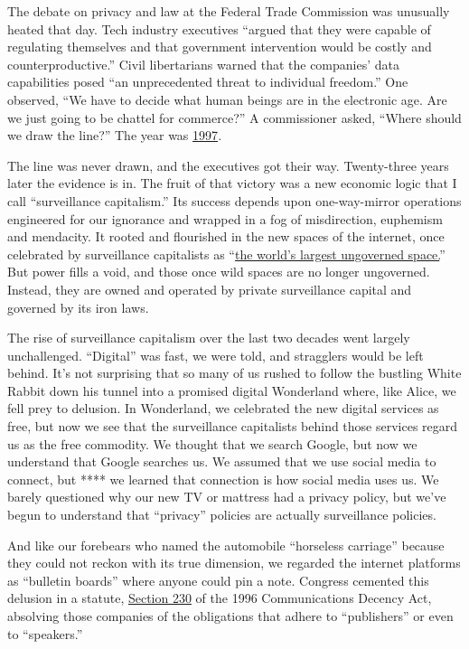 The debate on privacy and law at the Federal Trade Commission was
unusually heated that day. Tech industry executives ``argued that they
were capable of regulating themselves and that government intervention
would be costly and counterproductive.'' Civil libertarians warned that
the companies' data capabilities posed ``an unprecedented threat to
individual freedom.'' One observed, ``We have to decide what human
beings are in the electronic age. Are we just going to be chattel for
commerce?'' A commissioner asked, ``Where should we draw the line?'' The
year was
\href{https://www.nytimes.com/1997/06/11/us/ftc-opens-hearings-on-computers-threat-to-privacy-and-liberty.html?searchResultPosition=34}{1997}\emph{.}

The line was never drawn, and the executives got their way. Twenty-three
years later the evidence is in. The fruit of that victory was a new
economic logic that I call ``surveillance capitalism.'' Its success
depends upon one-way-mirror operations engineered for our ignorance and
wrapped in a fog of misdirection, euphemism and mendacity. It rooted and
flourished in the new spaces of the internet, once celebrated by
surveillance capitalists as
``\href{https://www.pbs.org/newshour/science/in-new-digital-age-google-leaders-see-more-possibilities-to-connect-the-worlds-7-billion}{the
world's largest ungoverned space.}'' But power fills a void, and those
once wild spaces are no longer ungoverned. Instead, they are owned and
operated by private surveillance capital and governed by its iron laws.

The rise of surveillance capitalism over the last two decades went
largely unchallenged. ``Digital'' was fast, we were told, and stragglers
would be left behind. It's not surprising that so many of us rushed to
follow the bustling White Rabbit down his tunnel into a promised digital
Wonderland where, like Alice, we fell prey to delusion. In Wonderland,
we celebrated the new digital services as free, but now we see that the
surveillance capitalists behind those services regard us as the free
commodity. We thought that we search Google, but now we understand that
Google searches us. We assumed that we use social media to connect, but
**** we learned that connection is how social media uses us. We barely
questioned why our new TV or mattress had a privacy policy, but we've
begun to understand that ``privacy'' policies are actually surveillance
policies.

And like our forebears who named the automobile ``horseless carriage''
because they could not reckon with its true dimension, we regarded the
internet platforms as ``bulletin boards'' where anyone could pin a note.
Congress cemented this delusion in a statute,
\href{https://www.law.cornell.edu/uscode/text/47/230}{Section 230} of
the 1996 Communications Decency Act, absolving those companies of the
obligations that adhere to ``publishers'' or even to ``speakers.''

